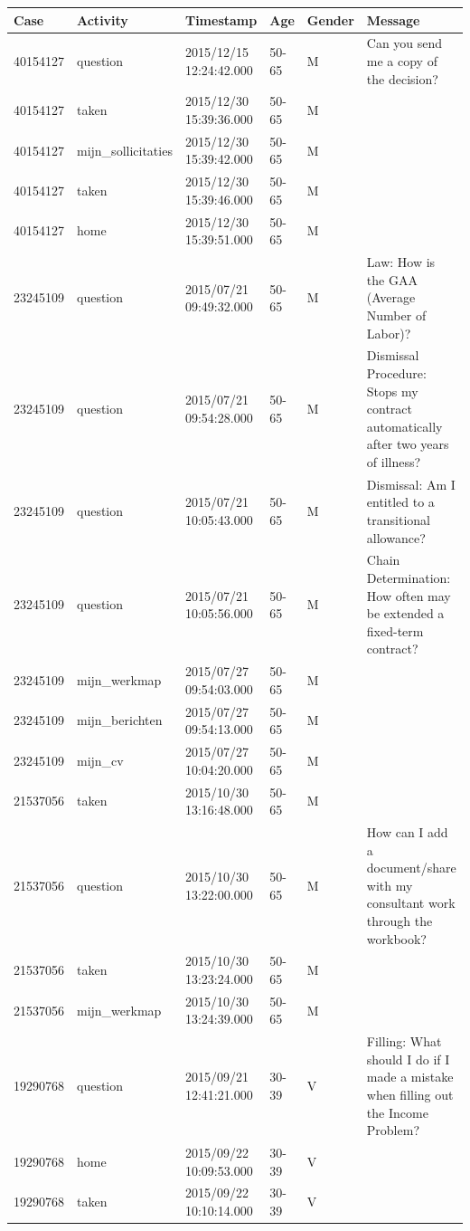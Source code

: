 \begin{appendices}
\begin{table}[!h]
	\tiny
	\setlength\tabcolsep{2pt}
	\begin{tabularx}{\textwidth}{lllllp{6.9cm}}
		\toprule
		\textbf{Case} & \textbf{Activity}          & \textbf{Timestamp} & \textbf{Age} & \textbf{Gender} & \textbf{Message} \\
		\midrule
		40154127&question&2015/12/15 12:24:42.000&50-65&M&Can you send me a copy of the decision?\\
		40154127&taken&2015/12/30 15:39:36.000&50-65&M&\\
		40154127&mijn\_sollicitaties&2015/12/30 15:39:42.000&50-65&M&\\
		40154127&taken&2015/12/30 15:39:46.000&50-65&M&\\
		40154127&home&2015/12/30 15:39:51.000&50-65&M&\\
		23245109&question&2015/07/21 09:49:32.000&50-65&M&Law: How is the GAA (Average Number of Labor)?\\
		23245109&question&2015/07/21 09:54:28.000&50-65&M&Dismissal Procedure: Stops my contract automatically after two years of illness?\\
		23245109&question&2015/07/21 10:05:43.000&50-65&M&Dismissal: Am I entitled to a transitional allowance?\\
		23245109&question&2015/07/21 10:05:56.000&50-65&M&Chain Determination: How often may be extended a fixed-term contract?\\
		23245109&mijn\_werkmap&2015/07/27 09:54:03.000&50-65&M&\\
		23245109&mijn\_berichten&2015/07/27 09:54:13.000&50-65&M&\\
		23245109&mijn\_cv&2015/07/27 10:04:20.000&50-65&M&\\
		21537056&taken&2015/10/30 13:16:48.000&50-65&M&\\
		21537056&question&2015/10/30 13:22:00.000&50-65&M&How can I add a document/share with my consultant work through the workbook?\\
		21537056&taken&2015/10/30 13:23:24.000&50-65&M&\\
		21537056&mijn\_werkmap&2015/10/30 13:24:39.000&50-65&M&\\
		19290768&question&2015/09/21 12:41:21.000&30-39&V&Filling: What should I do if I made a mistake when filling out the Income Problem?\\
		19290768&home&2015/09/22 10:09:53.000&30-39&V&\\
		19290768&taken&2015/09/22 10:10:14.000&30-39&V&\\

\end{tabularx}
\end{table}
\end{appendices}
